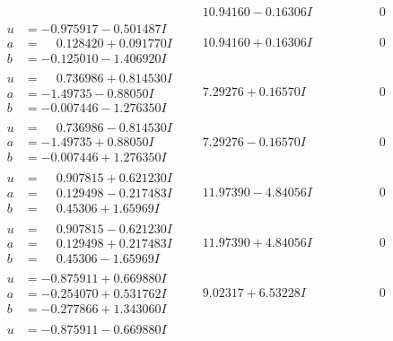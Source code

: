 \documentclass[1p]{elsarticle_modified}
\theoremstyle{definition}
\begin{document}
$$\begin{array}{c|c|c}
 & \phantom{-}10.94160 - 0.16306 I & \phantom{-0.000000 } 0 \\ \hline\begin{aligned}
u &= -0.975917 - 0.501487 I \\
a &= \phantom{-}0.128420 + 0.091770 I \\
b &= -0.125010 - 1.406920 I\end{aligned}
 & \phantom{-}10.94160 + 0.16306 I & \phantom{-0.000000 } 0 \\ \hline\begin{aligned}
u &= \phantom{-}0.736986 + 0.814530 I \\
a &= -1.49735 - 0.88050 I \\
b &= -0.007446 - 1.276350 I\end{aligned}
 & \phantom{-}7.29276 + 0.16570 I & \phantom{-0.000000 } 0 \\ \hline\begin{aligned}
u &= \phantom{-}0.736986 - 0.814530 I \\
a &= -1.49735 + 0.88050 I \\
b &= -0.007446 + 1.276350 I\end{aligned}
 & \phantom{-}7.29276 - 0.16570 I & \phantom{-0.000000 } 0 \\ \hline\begin{aligned}
u &= \phantom{-}0.907815 + 0.621230 I \\
a &= \phantom{-}0.129498 - 0.217483 I \\
b &= \phantom{-}0.45306 + 1.65969 I\end{aligned}
 & \phantom{-}11.97390 - 4.84056 I & \phantom{-0.000000 } 0 \\ \hline\begin{aligned}
u &= \phantom{-}0.907815 - 0.621230 I \\
a &= \phantom{-}0.129498 + 0.217483 I \\
b &= \phantom{-}0.45306 - 1.65969 I\end{aligned}
 & \phantom{-}11.97390 + 4.84056 I & \phantom{-0.000000 } 0 \\ \hline\begin{aligned}
u &= -0.875911 + 0.669880 I \\
a &= -0.254070 + 0.531762 I \\
b &= -0.277866 + 1.343060 I\end{aligned}
 & \phantom{-}9.02317 + 6.53228 I & \phantom{-0.000000 } 0 \\ \hline\begin{aligned}
u &= -0.875911 - 0.669880 I \\

\end{aligned}
\end{array}$$
\end{document}
